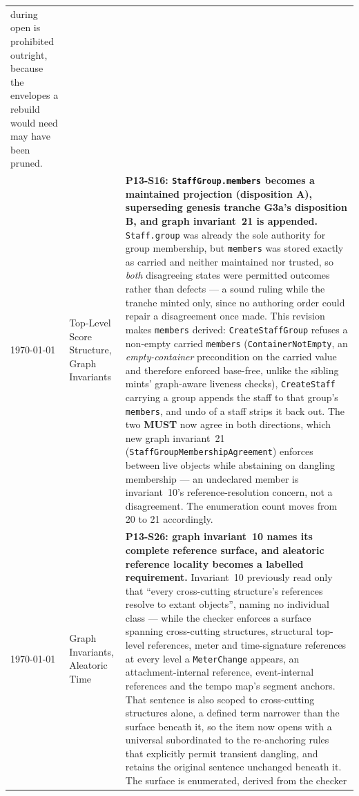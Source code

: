 \documentclass[11pt,letterpaper]{report}
\newcommand{\sectionsc}[1]{{\addfontfeatures{Letters=SmallCaps}#1}}
\newcounter{requirement}[chapter]
\newcommand{\MUST}{\textbf{MUST}}
\begin{document}
\begin{longtable}{p{2cm} p{2.5cm} p{9cm}}
  during open is prohibited outright, because the envelopes a rebuild would
  need may have been pruned.
  \\
  \today & \sectionsc{Top-Level Score Structure},
  \sectionsc{Graph Invariants} & \textbf{P13-S16: \texttt{StaffGroup.members}
  becomes a maintained projection (disposition A), superseding genesis tranche
  G3a's disposition B, and graph invariant~21 is appended.}
  \texttt{Staff.group} was already the sole authority for group membership, but
  \texttt{members} was stored exactly as carried and neither maintained nor
  trusted, so \emph{both} disagreeing states were permitted outcomes rather
  than defects --- a sound ruling while the tranche minted only, since no
  authoring order could repair a disagreement once made. This revision makes
  \texttt{members} derived: \texttt{CreateStaffGroup} refuses a non-empty
  carried \texttt{members} (\texttt{ContainerNotEmpty}, an
  \emph{empty-container} precondition on the carried value and therefore
  enforced base-free, unlike the sibling mints' graph-aware liveness checks),
  \texttt{CreateStaff} carrying a group appends the staff to that group's
  \texttt{members}, and undo of a staff strips it back out. The two \MUST{}
  now agree in both directions, which new graph invariant~21
  (\texttt{StaffGroupMembershipAgreement}) enforces between live objects while
  abstaining on dangling membership --- an undeclared member is
  invariant~10's reference-resolution concern, not a disagreement. The
  enumeration count moves from 20 to 21 accordingly.
  \\
  \today & \sectionsc{Graph Invariants}, \sectionsc{Aleatoric Time} &
  \textbf{P13-S26: graph invariant~10 names its complete reference surface,
  and aleatoric reference locality becomes a labelled requirement.} Invariant~10
  previously read only that ``every cross-cutting structure's references resolve
  to extant objects'', naming no individual class --- while the checker enforces
  a surface spanning cross-cutting structures, structural top-level references,
  meter and time-signature references at every level a \texttt{MeterChange}
  appears, an attachment-internal reference, event-internal references and the
  tempo map's segment anchors. That sentence is also scoped to cross-cutting
  structures alone, a defined term narrower than the surface beneath it, so the
  item now opens with a universal subordinated to the re-anchoring rules that
  explicitly permit transient dangling, and retains the original sentence
  unchanged beneath it. The surface is enumerated, derived from the checker

\end{longtable}
\end{document}
